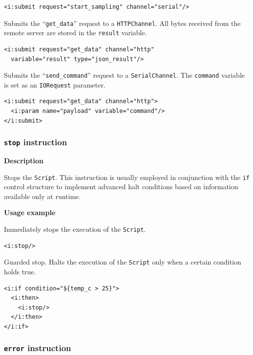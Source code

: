 \lstset{language=XML}
\begin{lstlisting}
<i:submit request="start_sampling" channel="serial"/>
\end{lstlisting}

Submits the ``\texttt{get\_data}'' request to a \texttt{HTTPChannel}. All
bytes received from the remote server are stored in the \texttt{result}
variable.

\lstset{language=XML}
\begin{lstlisting}
<i:submit request="get_data" channel="http"
  variable="result" type="json_result"/>
\end{lstlisting}

Submits the ``\texttt{send\_command}'' request to a \texttt{SerialChannel}.
The \texttt{command} variable is set as an \texttt{IORequest} parameter.

\lstset{language=XML}
\begin{lstlisting}
<i:submit request="get_data" channel="http">
  <i:param name="payload" variable="command"/>
</i:submit>
\end{lstlisting}


\subsubsection{\texttt{stop} instruction}

\textbf{Description}

Stops the \texttt{Script}. This instruction is usually employed in conjunction
with the \texttt{if} control structure to implement advanced halt conditions
based on information available only at runtime.

\textbf{Usage example}

Immediately stops the execution of the \texttt{Script}.

\lstset{language=XML}
\begin{lstlisting}
<i:stop/>
\end{lstlisting}

Guarded stop. Halts the execution of the \texttt{Script} only when a certain
condition holds true.

\lstset{language=XML}
\begin{lstlisting}
<i:if condition="${temp_c > 25}"> 
  <i:then>
    <i:stop/>
  </i:then>
</i:if>
\end{lstlisting}


\subsubsection{\texttt{error} instruction}

